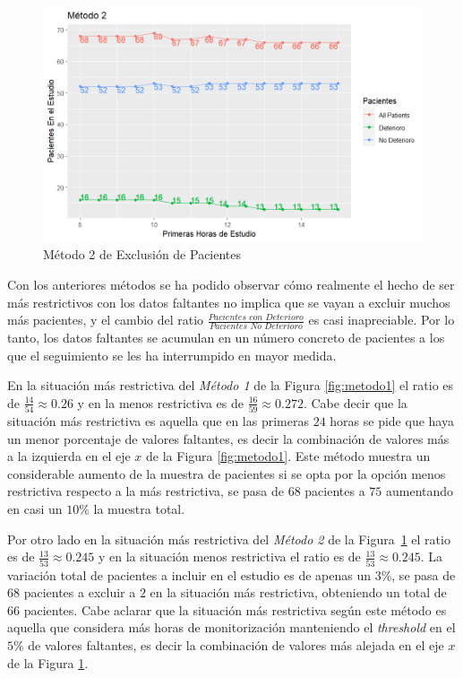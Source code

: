 \begin{figure}[H]
    \centering
    \includegraphics[scale = 1]{./img/metodo2.png}
    \caption{Método 2 de Exclusión de Pacientes}
    \label{fig:metodo2}
\end{figure}

Con los anteriores métodos se ha podido observar cómo realmente el hecho de ser más restrictivos con los datos faltantes no implica que se vayan a excluir muchos más pacientes, y el cambio del ratio $\frac{\textit{Pacientes con Deterioro}}{\textit{Pacientes No Deterioro}}$ es casi inapreciable. Por lo tanto, los datos faltantes se acumulan en un número concreto de pacientes a los que el seguimiento se les ha interrumpido en mayor medida.

En la situación más restrictiva del \textit{Método 1} de la Figura \ref{fig:metodo1} el ratio es de $ \frac{14}{54} \approx 0.26$ y en la menos restrictiva es de $ \frac{16}{59} \approx 0.272$. Cabe decir que la situación más restrictiva es aquella que en las primeras $24$ horas se pide que haya un menor porcentaje de valores faltantes, es decir la combinación de valores más a la izquierda en el eje $x$ de la Figura \ref{fig:metodo1}. Este método muestra un considerable aumento de la muestra de pacientes si se opta por la opción menos restrictiva respecto a la más restrictiva, se pasa de $68$ pacientes a $75$ aumentando en casi un $10 \%$ la muestra total. 

Por otro lado en la situación más restrictiva del \textit{Método 2} de la Figura~\ref{fig:metodo2} el ratio es de $ \frac{13}{53} \approx 0.245$ y en la situación menos restrictiva el ratio es de $ \frac{13}{53} \approx 0.245$. La variación total de pacientes a incluir en el estudio es de apenas un $3 \%$, se pasa de $68$ pacientes a excluir a $2$ en la situación más restrictiva, obteniendo un total de $66$ pacientes. Cabe aclarar que la situación más restrictiva según este método es aquella que considera más horas de monitorización manteniendo el \textit{threshold} en el $5 \%$ de valores faltantes, es decir la combinación de valores más alejada en el eje $x$ de la Figura \ref{fig:metodo2}.


